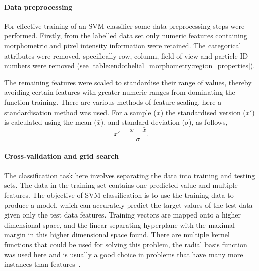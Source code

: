 \paragraph{Data preprocessing}
For effective training of an SVM classifier some data preprocessing steps were performed. Firstly, from the labelled data set only numeric features containing morphometric and pixel intensity information were retained. The categorical attributes were removed, specifically row, column, field of view and particle ID numbers were removed (see \autoref{table:endothelial_morphometry:region_properties}).

The remaining features were scaled to standardise their range of values, thereby avoiding certain features with greater numeric ranges from dominating the function training. There are various methods of feature scaling, here a standardisation method was used. For a sample ($x$) the standardised version ($x'$) is calculated using the mean ($\bar{x}$), and standard deviation ($\sigma$), as follows,
\begin{equation}
x'=\frac{x-\bar{x}}{\sigma}.
\end{equation}

\paragraph{Cross-validation and grid search}
The classification task here involves separating the data into training and testing sets. The data in the training set contains one predicted value and multiple features. The objective of SVM classification is to use the training data to produce a model, which can accurately predict the target values of the test data given only the test data features. Training vectors are mapped onto a higher dimensional space, and the linear separating hyperplane with the maximal margin in this higher dimensional space found. There are multiple kernel functions that could be used for solving this problem, the radial basis function was used here and is usually a good choice in problems that have many more instances than features~\cite{Hsu2008}.

